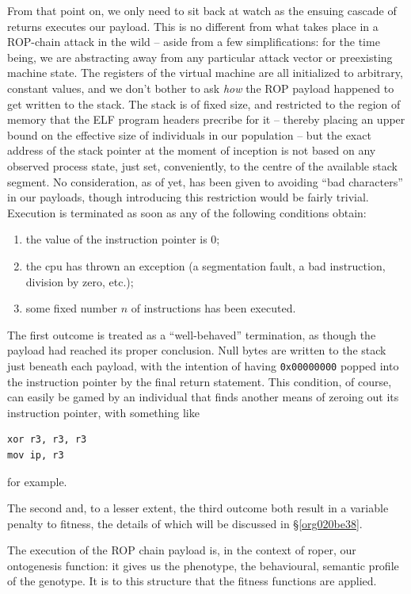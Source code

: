 \documentclass[12pt,glossary]{dalthesis}
\begin{document}
From that point on, we only need to sit back at watch as the ensuing cascade of
returns executes our payload. This is no different from what takes place in
a ROP-chain attack in the wild -- aside from a few simplifications: for the time
being, we are abstracting away from any particular attack vector or preexisting
machine state. The registers of the virtual machine are all initialized to arbitrary,
constant values, and we don't bother to ask \emph{how} the ROP payload happened to get
written to the stack. The stack is of fixed size, and restricted to the region
of memory that the ELF program headers precribe for it -- thereby placing an upper
bound on the effective size of individuals in our population -- but the exact
address of the stack pointer at the moment of inception is not based on any
observed process state, just set, conveniently, to the centre of the available
stack segment. No consideration, as of yet, has been given to avoiding ``bad
characters'' in our payloads, though introducing this restriction would be fairly
trivial. Execution is terminated as soon as any of the following conditions obtain:
\begin{enumerate}
\item the value of the instruction pointer is 0;
\item the \gls{cpu} has thrown an exception (a segmentation fault, a bad instruction,
division by zero, etc.);
\item some fixed number \(n\) of instructions has been executed.
\end{enumerate}

The first outcome is treated as a ``well-behaved'' termination, as though the
payload had reached its proper conclusion. Null bytes are written to the
stack just beneath each payload, with the intention of having \texttt{0x00000000}
popped into the instruction pointer by the final return statement. This condition, 
of course, can easily be gamed by an individual that finds another means of
zeroing out its instruction pointer, with something like
\begin{verbatim}
xor r3, r3, r3
mov ip, r3
\end{verbatim}
for example. 

The second and, to a lesser extent, the third outcome both result in a variable
penalty to fitness, the details of which will be discussed in \S \ref{org020be38}.

The execution of the ROP chain payload is, in the context of \gls{roper}, our
ontogenesis function: it gives us the phenotype, the behavioural, semantic
profile of the genotype. It is to this structure that the fitness functions
are applied. 
\end{document}
